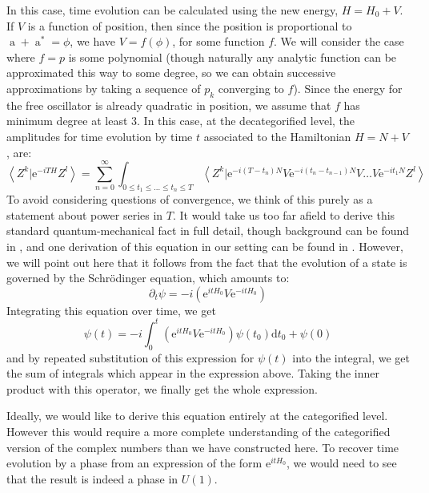 \documentclass{amsart} \usepackage{amsmath,amssymb,bbm}
\newcommand{\opname}[1]{\operatorname{#1}}
\newcommand{\inprod}[1]{\left\langle{#1}\right\rangle}
\newcommand{\mathd}{\mathrm{d}}
\newcommand{\mathe}{\mathrm{e}}
\begin{document}
In this case, time evolution can be calculated using the new energy,
$H = H_0 + V$.  If $V$ is a function of position, then since the
position is proportional to $\opname{a} + \opname{a}^{\ast} = \phi$,
we have $V = f(\phi)$, for some function $f$.  We will consider the
case where $f=p$ is some polynomial (though naturally any analytic
function can be approximated this way to some degree, so we can obtain
successive approximations by taking a sequence of $p_k$ converging to
$f$).  Since the energy for the free oscillator is already quadratic
in position, we assume that $f$ has minimum degree at least 3.  In
this case, at the decategorified level, the amplitudes for time
evolution by time $t$ associated to the Hamiltonian $H = N + V$, are:
\begin{equation}\label{eq:perturbfeynman}
\inprod{Z^k|\mathe^{-iTH}Z^l} = \sum_{n=0}^{\infty} \int_{0 \leq t_1 \leq \dots \leq t_n \leq T} \inprod{Z^k|\mathe^{-i(T-t_n)N}V\mathe^{-i(t_n-t_{n-1})N}V \dots V\mathe^{-it_1N} Z^l}
\end{equation}
To avoid considering questions of convergence, we think of this purely
as a statement about power series in $T$.  It would take us too far
afield to derive this standard quantum-mechanical fact in full detail,
though background can be found in \cite{bjordrel}, and one derivation
of this equation in our setting can be found in \cite{catquan}.
However, we will point out here that it follows from the fact that the
evolution of a state is governed by the Schr\"odinger equation, which
amounts to:
\begin{equation}
\partial_t \psi = -i (\mathe^{itH_0}V\mathe^{-itH_0})
\end{equation}
Integrating this equation over time, we get
\begin{equation}
\psi(t) = -i \int_0^t (\mathe^{itH_0}V\mathe^{-itH_0})\psi(t_0) \mathd t_0 + \psi(0)
\end{equation}
and by repeated substitution of this expression for $\psi(t)$ into the
integral, we get the sum of integrals which appear in the expression
above.  Taking the inner product with this operator, we finally get
the whole expression.

Ideally, we would like to derive this equation entirely at the
categorified level.  However this would require a more complete
understanding of the categorified version of the complex numbers than
we have constructed here.  To recover time evolution by a phase from
an expression of the form $\mathe^{itH_0}$, we would need to see that
the result is indeed a phase in $U(1)$.
\end{document}
